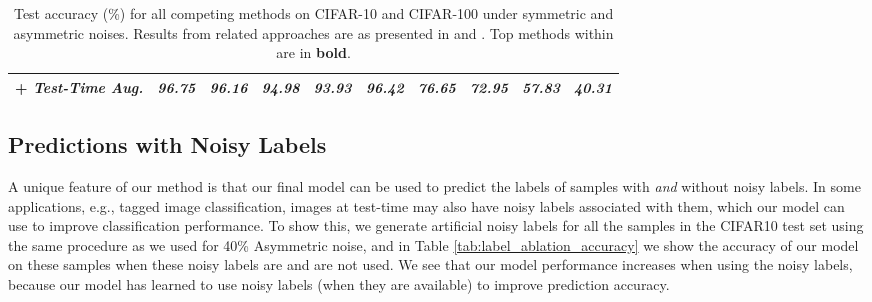\documentclass[10pt,twocolumn,letterpaper]{article}
\begin{document}
\begin{table*}[t!]
\begin{center}
{\begin{tabular}{l|cccc|c||cccc}
            {\hskip 0.5cm} + \textit{Test-Time Aug.} & \textit{96.75} & \textit{96.16} & \textit{94.98} & \textit{93.93} & \textit{96.42} & \textit{76.65} & \textit{72.95} & \textit{57.83} & \textit{40.31} \\
            \bottomrule
        \end{tabular}
    }
    \end{center}
    \caption{Test accuracy (\%) for all competing methods on CIFAR-10 and CIFAR-100 under symmetric and asymmetric noises. Results from related approaches are as presented in \citep{li2020dividemix} and \cite{wu2021ngc}. Top methods within  are in \textbf{bold}.} 
    \label{tab:results_cifar_2}
\end{table*}

\subsection{Predictions with Noisy Labels}

A unique feature of our method is that our final model can be used to predict the labels of samples with \textit{and} without noisy labels. In some applications, e.g., tagged image classification, images at test-time may also have noisy labels associated with them, which our model can use to improve classification performance. To show this, we generate artificial noisy labels for all the samples in the CIFAR10 test set using the same procedure as we used for 40\% Asymmetric noise, and in Table \ref{tab:label_ablation_accuracy} we show the accuracy of our model on these samples when these noisy labels are and are not used. We see that our model performance  increases when using the noisy labels, because our model has learned to use noisy labels (when they are available) to improve prediction accuracy.

\begin{table}[t!]
    \begin{center}
    \end{center}
    \caption{\small Accuracy of our model tested with and without noisy labels on CIFAR10 Asym. 40\% noise. Noisy labels are generated for training and testing samples using the same procedure.} 
    \label{tab:label_ablation_accuracy}
\end{table}
\end{document}
